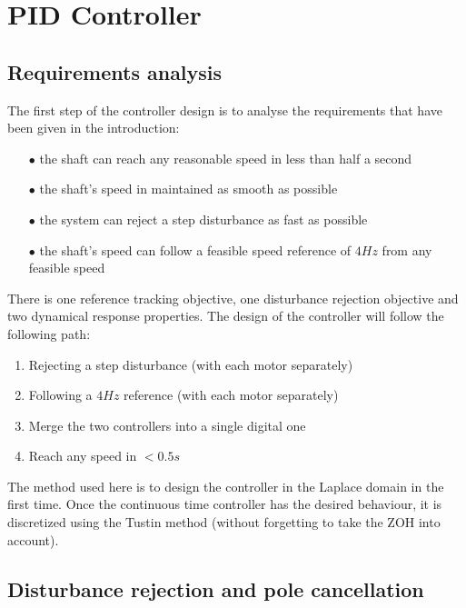 \setcounter{secnumdepth}{1}

\chapter{PID Controller}
\label{section:PID controller}

\section{Requirements analysis}

The first step of the controller design is to analyse the requirements that have been given in the introduction:

\begin{enumerate}
    \item[$\bullet$] the shaft can reach any reasonable speed in less than half a second
    \item[$\bullet$] the shaft's speed in maintained as smooth as possible
    \item[$\bullet$] the system can reject a step disturbance as fast as possible
    \item[$\bullet$] the shaft's speed can follow a feasible speed reference of $4 Hz$ from any feasible speed
\end{enumerate}

There is one reference tracking objective, one disturbance rejection objective and two dynamical response properties.
The design of the controller will follow the following path:

\begin{enumerate}
    \item Rejecting a step disturbance (with each motor separately)
    \item Following a $4 Hz$ reference (with each motor separately)
    \item Merge the two controllers into a single digital one
    \item Reach any speed in $< 0.5 s$
\end{enumerate}

The method used here is to design the controller in the Laplace domain in the first time. Once the continuous time
controller has the desired behaviour, it is discretized using the Tustin method (without forgetting to take the
ZOH into account).

\section{Disturbance rejection and pole cancellation}

